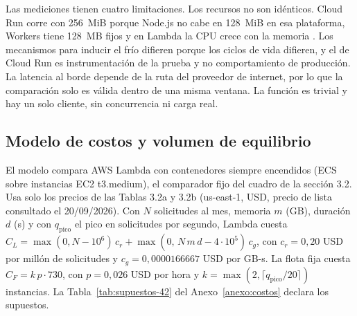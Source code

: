 \documentclass[12pt, letterpaper, table, xcdraw]{inf-pucv}
\begin{document}
Las mediciones tienen cuatro limitaciones. Los recursos no son idénticos. Cloud Run
corre con 256~MiB porque Node.js no cabe en
128~MiB en esa plataforma, Workers tiene 128~MB fijos \parencite{cloudflare2026workerslimits} y en
Lambda la CPU crece con la memoria \parencite{awsLambdaMemory}. Los mecanismos para
inducir el frío difieren porque los ciclos de vida difieren, y el de Cloud Run es
instrumentación de la prueba y no comportamiento de producción. La latencia al borde
depende de la ruta del proveedor de internet, por lo que la comparación solo es válida
dentro de una misma ventana. La función es trivial y hay un solo cliente, sin
concurrencia ni carga real.

\subsection{Modelo de costos y volumen de equilibrio}
\label{sec:costos}

El modelo compara AWS Lambda con contenedores siempre encendidos (ECS sobre instancias EC2 t3.medium), el comparador fijo del cuadro de la sección 3.2. Usa solo los precios de las Tablas 3.2a y 3.2b (us-east-1, USD, precio de lista consultado el 20/09/2026). Con $N$ solicitudes al mes, memoria $m$ (GB), duración $d$ (s) y con $q_{\mathrm{pico}}$ el pico en solicitudes por segundo, Lambda cuesta $C_L=\max(0,N-10^{6})\,c_r+\max(0,\,N\,m\,d-4\cdot10^{5})\,c_g$, con $c_r=0{,}20$ USD por millón de solicitudes y $c_g=0{,}0000166667$ USD por GB-s. La flota fija cuesta $C_F=k\,p\cdot730$, con $p=0{,}026$ USD por hora y $k=\max(2,\lceil q_{\mathrm{pico}}/20\rceil)$ instancias. La Tabla~\ref{tab:supuestos-42} del Anexo~\ref{anexo:costos} declara los supuestos.
\end{document}
